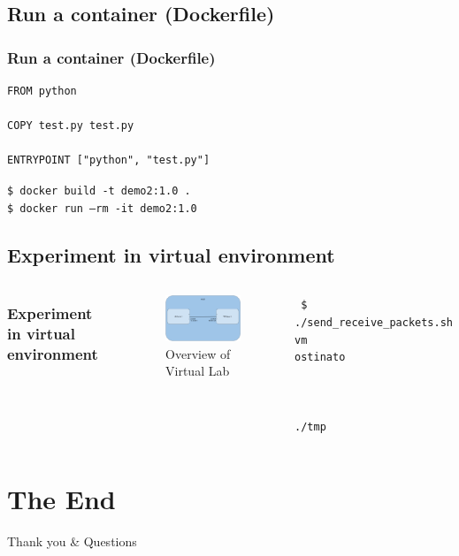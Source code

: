\documentclass{beamer}
\begin{document}
\subsection{Run a container (Dockerfile)}
\begin{frame}[fragile]
  \frametitle{Run a container (Dockerfile)}
  \begin{example}
    \begin{verbatim}
FROM python

COPY test.py test.py

ENTRYPOINT ["python", "test.py"]
    \end{verbatim}
  \end{example}
  \texttt{\$ docker build -t demo2:1.0 .\\\$ docker run --rm -it demo2:1.0}
\end{frame}

\subsection{Experiment in virtual environment}
\begin{frame}
  \begin{columns}[c] %

    \frametitle{Experiment in virtual environment}
    \begin{figure}[h!]
      \centering
      \includegraphics[width=5.5cm]{../tex/figure/vmenv}
      \caption{Overview of Virtual Lab}
      \label{fig:vmenv}
    \end{figure}
    \texttt{
      \$ ./send\_receive\_packets.sh
      \\\qquad vm
      \\\qquad ostinato
      \\
      \\
      \\
      \\\qquad ./tmp
    }
  \end{columns}
\end{frame}

\section{The End}
\begin{frame}
  \Huge{\centerline{Thank you \& Questions}}
\end{frame}

\end{document}
